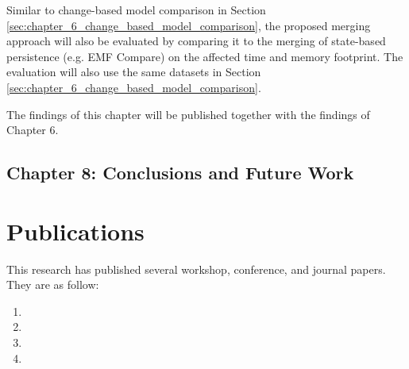 Similar to change-based model comparison in Section \ref{sec:chapter_6_change_based_model_comparison}, the proposed merging approach will also be evaluated by comparing it to the merging of state-based persistence (e.g. EMF Compare) on the affected time and memory footprint. The evaluation will also use the same datasets in Section \ref{sec:chapter_6_change_based_model_comparison}.

The findings of this chapter will be published together with the findings of Chapter 6.

\subsection{Chapter 8: Conclusions and Future Work}
\label{sec:chapter_8_conclusions_and_future_work}


\section{Publications}
\label{sec:publications}
This research has published several workshop, conference, and journal papers. They are as follow:
\begin{enumerate}
  \item
  \item
  \item
  \item 
\end{enumerate}





